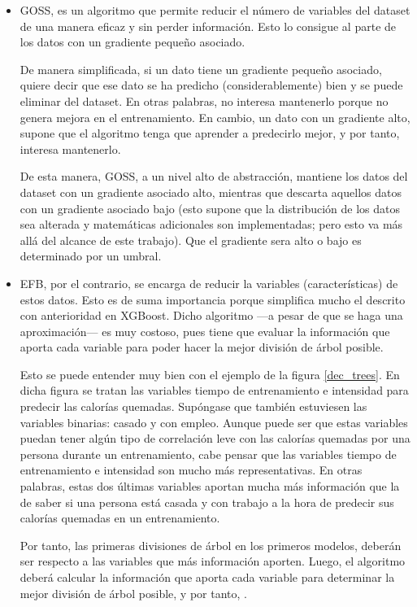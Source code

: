 \begin{itemize}
    \item GOSS, es un algoritmo que permite reducir el número de variables del dataset de una manera eficaz y sin perder información. Esto lo consigue al  parte de los datos con un gradiente pequeño asociado. 
    
    De manera simplificada, si un dato tiene un gradiente pequeño asociado, quiere decir que ese dato se ha predicho (considerablemente) bien y se puede eliminar del dataset. En otras palabras, no interesa mantenerlo porque no genera mejora en el entrenamiento. En cambio, un dato con un gradiente alto, supone que el algoritmo tenga que aprender a predecirlo mejor, y por tanto, interesa mantenerlo. 
    
    De esta manera, GOSS, a un nivel alto de abstracción, mantiene los datos del dataset con un gradiente asociado alto, mientras que descarta aquellos datos con un gradiente asociado bajo (esto supone que la distribución de los datos sea alterada y matemáticas adicionales son implementadas; pero esto va más allá del alcance de este trabajo). Que el gradiente sera alto o bajo es determinado por un umbral.
    \item EFB, por el contrario, se encarga de reducir la variables (características) de estos datos. Esto es de suma importancia porque simplifica mucho el  descrito con anterioridad en XGBoost. Dicho algoritmo ---a pesar de que se haga una aproximación--- es muy costoso, pues tiene que evaluar la información que aporta cada variable para poder hacer la mejor división de árbol posible.
    
    Esto se puede entender muy bien con el ejemplo de la figura \ref{dec_trees}. En dicha figura se tratan las variables tiempo de entrenamiento e intensidad para predecir las  calorías quemadas. Supóngase que también estuviesen las variables binarias: casado y con empleo. Aunque puede ser que estas variables puedan tener algún tipo de correlación leve con las calorías quemadas por una persona durante un entrenamiento, cabe pensar que las variables tiempo de entrenamiento e intensidad son mucho más representativas. En otras palabras, estas dos últimas variables aportan mucha más información que la de saber si una persona está casada y con trabajo a la hora de predecir sus calorías quemadas en un entrenamiento. 
    
    Por tanto, las primeras divisiones de árbol en los primeros modelos, deberán ser respecto a las variables que más información aporten. Luego, el algoritmo deberá calcular la información que aporta cada variable para determinar la mejor división de árbol posible, y por tanto, .
    

\end{itemize}
